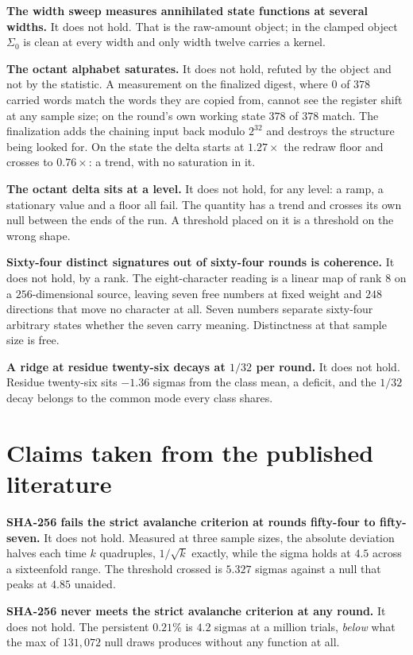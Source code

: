 \textbf{The width sweep measures annihilated state functions at several widths.} It does not hold. That is the raw-amount object; in the clamped object \(\Sigma_0\) is clean at every width and only width twelve carries a kernel.

\textbf{The octant alphabet saturates.} It does not hold, refuted by the object and not by the statistic. A measurement on the finalized digest, where \(0\) of \(378\) carried words match the words they are copied from, cannot see the register shift at any sample size; on the round's own working state \(378\) of \(378\) match. The finalization adds the chaining input back modulo \(2^{32}\) and destroys the structure being looked for. On the state the delta starts at \(1.27\times\) the redraw floor and crosses to \(0.76\times\): a trend, with no saturation in it.

\textbf{The octant delta sits at a level.} It does not hold, for any level: a ramp, a stationary value and a floor all fail. The quantity has a trend and crosses its own null between the ends of the run. A threshold placed on it is a threshold on the wrong shape.

\textbf{Sixty-four distinct signatures out of sixty-four rounds is coherence.} It does not hold, by a rank. The eight-character reading is a linear map of rank \(8\) on a \(256\)-dimensional source, leaving seven free numbers at fixed weight and \(248\) directions that move no character at all. Seven numbers separate sixty-four arbitrary states whether the seven carry meaning. Distinctness at that sample size is free.

\textbf{A ridge at residue twenty-six decays at \(1/32\) per round.} It does not hold. Residue twenty-six sits \(-1.36\) sigmas from the class mean, a deficit, and the \(1/32\) decay belongs to the common mode every class shares.

\section{Claims taken from the published literature}

\textbf{SHA-256 fails the strict avalanche criterion at rounds fifty-four to fifty-seven.} It does not hold. Measured at three sample sizes, the absolute deviation halves each time \(k\) quadruples, \(1/\sqrt{k}\) exactly, while the sigma holds at \(4.5\) across a sixteenfold range. The threshold crossed is \(5.327\) sigmas against a null that peaks at \(4.85\) unaided.

\textbf{SHA-256 never meets the strict avalanche criterion at any round.} It does not hold. The persistent \(0.21\%\) is \(4.2\) sigmas at a million trials, \emph{below} what the max of \(131{,}072\) null draws produces without any function at all.

